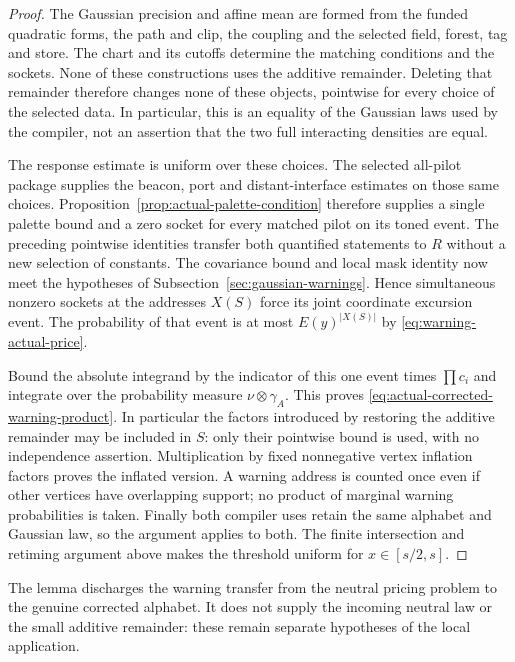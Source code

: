 \begin{proof}
The Gaussian precision and affine mean are formed from the funded
quadratic forms, the path and clip, the coupling and the selected
field, forest, tag and store. The chart and its cutoffs determine the
matching conditions and the sockets. None of these constructions uses
the additive remainder. Deleting that remainder therefore changes none
of these objects, pointwise for every choice of the selected data.
In particular, this is an equality of the Gaussian laws used by the
compiler, not an assertion that the two full interacting densities are
equal.

The response estimate is uniform over these choices. The selected
all-pilot package supplies the beacon, port and distant-interface estimates
on those same choices. Proposition~\ref{prop:actual-palette-condition}
therefore supplies a single palette bound and a zero socket for every
matched pilot on its toned event. The preceding pointwise identities
transfer both quantified statements to $R$ without a new selection of
constants. The covariance bound and local mask identity now meet
the hypotheses of Subsection~\ref{sec:gaussian-warnings}. Hence simultaneous
nonzero sockets at the addresses $X(S)$ force its joint coordinate
excursion event. The probability of that event is at most
$E(y)^{|X(S)|}$ by \eqref{eq:warning-actual-price}.

Bound the absolute integrand by the indicator of this one event times
$\prod c_i$ and integrate over the probability measure
$\nu\otimes\gamma_A$. This proves
\eqref{eq:actual-corrected-warning-product}. In particular the factors
introduced by restoring the additive remainder may be included in $S$:
only their pointwise bound is used, with no independence assertion.
Multiplication by fixed nonnegative vertex inflation factors proves the
inflated version. A warning address is counted once even if other
vertices have overlapping support; no product of marginal warning
probabilities is taken. Finally both compiler uses retain the same
alphabet and Gaussian law, so the argument applies to both. The finite
intersection and retiming argument above makes the threshold uniform
for $x\in[s/2,s]$.
\end{proof}

The lemma discharges the warning transfer from the neutral pricing
problem to the genuine corrected alphabet. It does not supply the
incoming neutral law or the small additive remainder: these remain
separate hypotheses of the local application.

